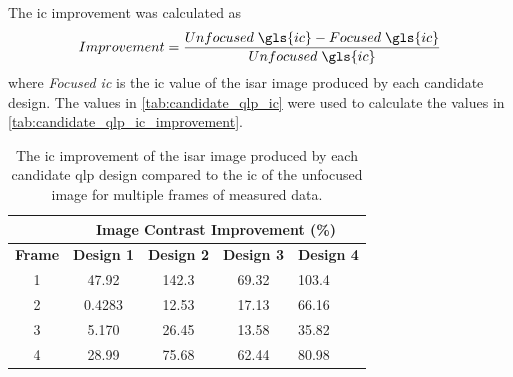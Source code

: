 \documentclass[class=report,11pt,crop=false]{standalone}
\begin{document}
    The \gls{ic} improvement was calculated as 
    \begin{equation}
        Improvement = \frac{Unfocused \hspace{0.1cm} \gls{ic}-Focused \hspace{0.1cm} \gls{ic}}{Unfocused \hspace{0.1cm} \gls{ic}}
    \end{equation}
    where \emph{Focused \gls{ic}} is the \gls{ic} value of the \gls{isar} image produced by each candidate design. The values in \autoref{tab:candidate_qlp_ic} were used to calculate the values in \autoref{tab:candidate_qlp_ic_improvement}.
    
    \begin{table}[H]
        \centering
        \begin{tabular}{c|llll|}
            \cline{2-5}
            & \multicolumn{4}{c|}{\textbf{Image Contrast Improvement (\%)}}                                                \\ \hline
            \multicolumn{1}{|c|}{\textbf{Frame}} & \multicolumn{1}{c|}{\textbf{Design 1}} & \multicolumn{1}{c|}{\textbf{Design 2}}             & \multicolumn{1}{c|}{\textbf{Design 3}} & \textbf{Design 4}             \\ \hline
            \multicolumn{1}{|c|}{1}              & \multicolumn{1}{c|}{47.92}             & \multicolumn{1}{c|}{\cellcolor[HTML]{EFEFEF}142.3} & \multicolumn{1}{c|}{69.32}             & 103.4                         \\ \hline
            \multicolumn{1}{|c|}{2}              & \multicolumn{1}{c|}{0.4283}            & \multicolumn{1}{c|}{12.53}                         & \multicolumn{1}{c|}{17.13}             & \cellcolor[HTML]{EFEFEF}66.16 \\ \hline
            \multicolumn{1}{|c|}{3}              & \multicolumn{1}{c|}{5.170}             & \multicolumn{1}{c|}{26.45}                         & \multicolumn{1}{c|}{13.58}             & \cellcolor[HTML]{EFEFEF}35.82 \\ \hline
            \multicolumn{1}{|c|}{4}              & \multicolumn{1}{c|}{28.99}             & \multicolumn{1}{c|}{75.68}                         & \multicolumn{1}{c|}{62.44}             & \cellcolor[HTML]{EFEFEF}80.98 \\ \hline
        \end{tabular}
        \caption{The \gls{ic} improvement of the \gls{isar} image produced by each candidate \gls{qlp} design compared to the \gls{ic} of the unfocused image for multiple frames of measured data.}
        \label{tab:candidate_qlp_ic_improvement}
    \end{table}
\end{document}
